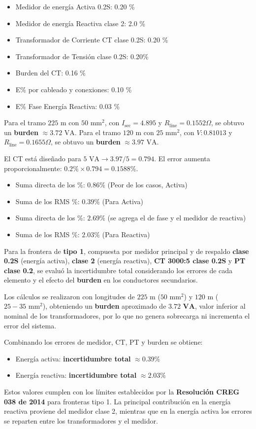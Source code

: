 \begin{itemize}
    \item Medidor de energía Activa 0.2S: 0.20 \%
    \item Medidor de energía Reactiva clase 2: 2.0 \%
    \item Transformador de Corriente CT clase 0.2S: 0.20 \%
    \item Transformador de Tensión clase 0.2S: 0.20\%
    \item Burden del CT: 0.16 \%
    \item E\% por cableado y conexiones: 0.10 \%
    \item E\% Fase Energía Reactiva: 0.03 \%
\end{itemize}
Para el tramo $225 \text{ m}$ con $50 \text{ mm}^2$, con $I_{\text{sec}}=4.895$ y $R_{\text{line}}=0.1552 \Omega$, se obtuvo un \textbf{burden} $\approx 3.72 \text{ VA}$.
Para el tramo $120 \text{ m}$ con $25 \text{ mm}^2$, con $V:0.81013$ y $R_{\text{line}}=0.1655 \Omega$, se obtuvo un \textbf{burden} $\approx 3.97 \text{ VA}$.

El CT está diseñado para $5 \text{ VA} \rightarrow 3.97/5=0.794$. El error aumenta proporcionalmente: $0.2\% \times 0.794 = 0.1588 \%$.

\begin{itemize}
    \item Suma directa de los \%: $0.86 \%$ (Peor de los casos, Activa)
    \item Suma de los RMS \%: $0.39 \%$ (Para Activa)
    \item Suma directa de los \%: $2.69 \%$ (se agrega el de fase y el medidor de reactiva)
    \item Suma de los RMS \%: $2.03 \%$ (Para Reactiva)
\end{itemize}
Para la frontera de \textbf{tipo 1}, compuesta por medidor principal y de respaldo \textbf{clase 0.2S} (energía activa), \textbf{clase 2} (energía reactiva), \textbf{CT 3000:5 clase 0.2S} y \textbf{PT clase 0.2}, se evaluó la incertidumbre total considerando los errores de cada elemento y el efecto del \textbf{burden} en los conductores secundarios.

Los cálculos se realizaron con longitudes de $225 \text{ m}$ ($50 \text{ mm}^2$) y $120 \text{ m}$ ($25-35 \text{ mm}^2$), obteniendo un \textbf{burden} aproximado de $\mathbf{3.72 \text{ VA}}$, valor inferior al nominal de los transformadores, por lo que no genera sobrecarga ni incrementa el error del sistema.

Combinando los errores de medidor, CT, PT y burden se obtiene:
\begin{itemize}
    \item Energía activa: \textbf{incertidumbre total} $\approx \mathbf{0.39 \%}$
    \item Energía reactiva: \textbf{incertidumbre total} $\approx \mathbf{2.03 \%}$
\end{itemize}
Estos valores cumplen con los límites establecidos por la \textbf{Resolución CREG 038 de 2014} para fronteras tipo 1. La principal contribución en la energía reactiva proviene del medidor clase 2, mientras que en la energía activa los errores se reparten entre los transformadores y el medidor.

